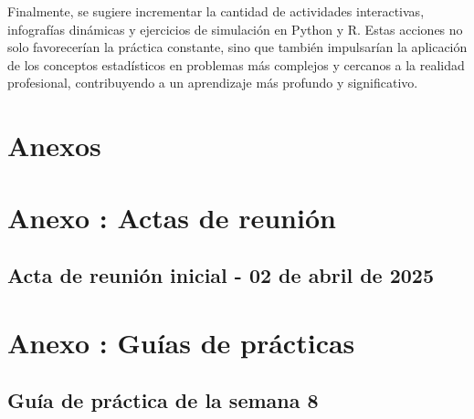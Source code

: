 \documentclass[letter,oneside,12pt,spanish]{report}
\begin{document}
Finalmente, se sugiere incrementar la cantidad de actividades interactivas, infografías dinámicas y ejercicios de simulación en Python y R. Estas acciones no solo favorecerían la práctica constante, sino que también impulsarían la aplicación de los conceptos estadísticos en problemas más complejos y cercanos a la realidad profesional, contribuyendo a un aprendizaje más profundo y significativo.

\newpage

%
%

\printbibliography

\nocite{poniszewska-maranda, burns-kubernetes, torres-bosch-microservicios, armstrong2015,kubevirtio, docker2023, kubelet-doc, namespace-article}
\newpage

\appendix

\chapter*{Anexos}

\chapter*{Anexo \thechapter: Actas de reunión}
\label{anexo:actas}

\section*{Acta de reunión inicial - 02 de abril de 2025}
\label{anexo:acta-abril-2025}



\chapter*{Anexo \thechapter: Guías de prácticas}
\label{anexo:Guía Semana 8}

\section*{Guía de práctica de la semana 8}
\label{anexo:Guía-Semana-8}






\end{document}
